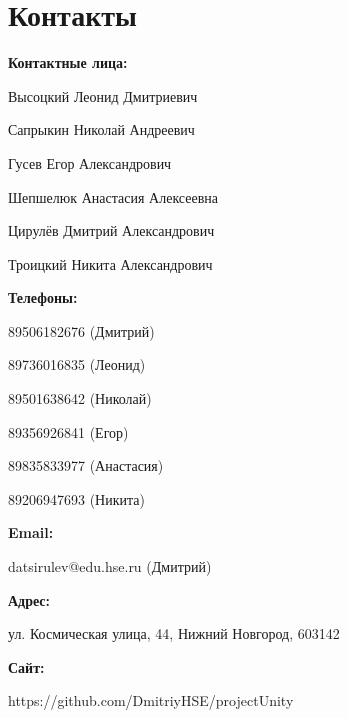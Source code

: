 \documentclass{article}
\begin{document}
\section{Контакты}
    \item \textbf{Контактные лица:} \par
    Высоцкий Леонид Дмитриевич \par
    Сапрыкин Николай Андреевич \par
    Гусев Егор Александрович \par
    Шепшелюк Анастасия Алексеевна \par
    Цирулёв Дмитрий Александрович \par
    Троицкий Никита Александрович \par
    \item \textbf{Телефоны:} \par
    89506182676 (Дмитрий) \par
    89736016835 (Леонид) \par
    89501638642 (Николай) \par
    89356926841 (Егор) \par
    89835833977 (Анастасия) \par
    89206947693 (Никита) \par
    \item \textbf{Email:} \par
    datsirulev@edu.hse.ru (Дмитрий)
    \item \textbf{Адрес:} \par
    ул. Космическая улица, 44, Нижний Новгород, 603142
    \item \textbf{Сайт:} \par
    https://github.com/DmitriyHSE/projectUnity
\end{document}

